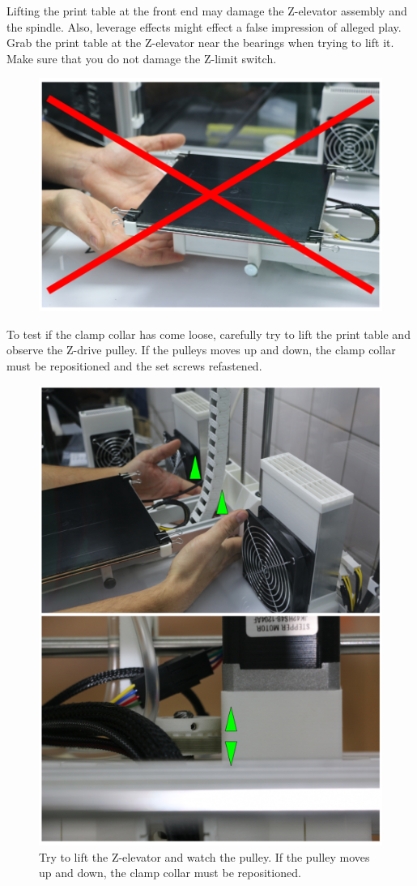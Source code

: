 \begin{info}
  Lifting the print table at the front end may damage the Z-elevator assembly and the spindle. Also, leverage effects might effect a false impression of alleged play.
  Grab the print table at the Z-elevator near the bearings when trying to lift it.
  Make sure that you do not damage the Z-limit switch. 

  \begin{figure}[H]
    \centering
    \includegraphics[width=.7\linewidth]{./img/mtc_liftelevatorincorrect.png}
  \end{figure}
\end{info}

To test if the clamp collar has come loose, carefully try to lift the print table and observe the Z-drive pulley.
If the pulleys moves up and down, the clamp collar must be repositioned and the set screws refastened. 

\begin{figure}[H]
  \centering
  \includegraphics[width=.7\linewidth]{./img/mtc_liftelevatorwatchpulley.png}
  \caption{Try to lift the Z-elevator and watch the pulley. If the pulley moves up and down, 
           the clamp collar must be repositioned.}
\end{figure}

